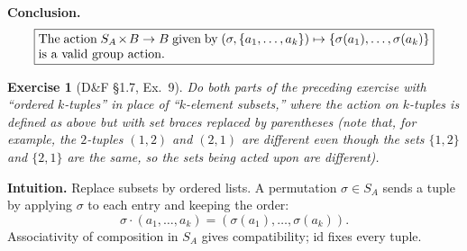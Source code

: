 \documentclass[12pt]{article}
\newtheorem{exercise}[theorem]{Exercise}
\theoremstyle{definition}
\begin{document}
\noindent\textbf{Conclusion.}
\[
\boxed{\parbox{0.9\linewidth}{
The action $S_A \times B \to B$ given by
$(\sigma,\{a_1,\dots,a_k\}) \mapsto \{\sigma(a_1),\dots,\sigma(a_k)\}$
is a valid group action.
}}
\]

\newpage

\begin{exercise}[D\&F §1.7, Ex.~9]
Do both parts of the preceding exercise with ``ordered $k$-tuples'' in place of ``$k$-element
subsets,'' where the action on $k$-tuples is defined as above but with set braces replaced by
parentheses \emph{(note that, for example, the $2$-tuples $(1,2)$ and $(2,1)$ are different even though
the sets $\{1,2\}$ and $\{2,1\}$ are the same, so the sets being acted upon are different)}.
\end{exercise}

\dotfill

\noindent\textbf{Intuition.}
Replace subsets by ordered lists. A permutation $\sigma\in S_A$ sends a tuple
by applying $\sigma$ to each entry and keeping the order:
\[
\sigma\cdot(a_1,\dots,a_k)=(\sigma(a_1),\dots,\sigma(a_k)).
\]
Associativity of composition in $S_A$ gives compatibility; $\mathrm{id}$ fixes every tuple.

\dotfill
\end{document}
